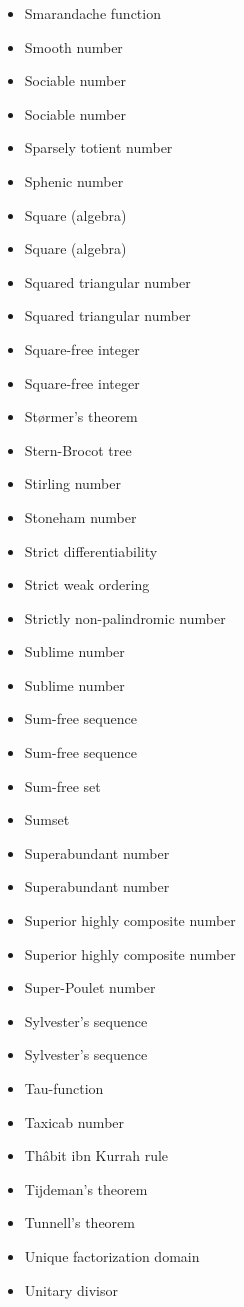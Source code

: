 \documentclass[12pt]{article}
\begin{document}
\begin{itemize}
\item Smarandache function 
\item Smooth number 
\item Sociable number 
\item Sociable number 
\item Sparsely totient number 
\item Sphenic number 
\item Square (algebra) 
\item Square (algebra) 
\item Squared triangular number 
\item Squared triangular number 
\item Square-free integer 
\item Square-free integer 
\item St\o{}rmer's theorem 
\item Stern-Brocot tree 
\item Stirling number 
\item Stoneham number 
\item Strict differentiability 
\item Strict weak ordering 
\item Strictly non-palindromic number 
\item Sublime number 
\item Sublime number 
\item Sum-free sequence 
\item Sum-free sequence 
\item Sum-free set 
\item Sumset 
\item Superabundant number 
\item Superabundant number 
\item Superior highly composite number 
\item Superior highly composite number 
\item Super-Poulet number 
\item Sylvester's sequence 
\item Sylvester's sequence 
\item Tau-function 
\item Taxicab number 
\item Th\^abit ibn Kurrah rule 
\item Tijdeman's theorem 
\item Tunnell's theorem 
\item Unique factorization domain 
\item Unitary divisor 

\end{itemize}
\end{document}
